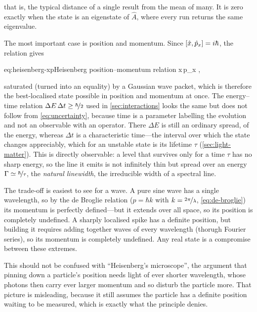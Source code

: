     that is, the typical distance of a single result from the mean of many. It is zero exactly when the state is an eigenstate of $\hat{A}$, where every run returns the same eigenvalue.

    The most important case is position and momentum. Since $\left[\hat{x},\hat{p}_x\right] = i\hbar$, the relation gives

    \begin{keyeq}{eq:heisenberg-xp}{Heisenberg position--momentum relation}
        \Delta x\,\Delta p_x \geq {},
    \end{keyeq}

    saturated (turned into an equality) by a Gaussian wave packet, which is therefore the best-localised state possible in position and momentum at once. The energy--time relation $\Delta E\,\Delta t \geq \nicefrac{\hbar}{2}$ used in \cref{sec:interactions} looks the same but does not follow from \cref{eq:uncertainty}, because time is a parameter labelling the evolution and not an observable with an operator. There $\Delta E$ is still an ordinary spread, of the energy, whereas $\Delta t$ is a characteristic time---the interval over which the state changes appreciably, which for an unstable state is its lifetime $\tau$ (\cref{sec:light-matter}). This is directly observable: a level that survives only for a time $\tau$ has no sharp energy, so the line it emits is not infinitely thin but spread over an energy $\Gamma \simeq \nicefrac{\hbar}{\tau}$, the \emph{natural linewidth}, the irreducible width of a spectral line.

    The trade-off is easiest to see for a wave. A pure sine wave has a single wavelength, so by the de Broglie relation ($p = \hbar k$ with $k = \nicefrac{2\pi}{\lambda}$, \cref{eq:de-broglie}) its momentum is perfectly defined---but it extends over all space, so its position is completely undefined. A sharply localised spike has a definite position, but building it requires adding together waves of every wavelength (thorugh Fourier series), so its momentum is completely undefined. Any real state is a compromise between these extremes.

    This should not be confused with \enquote{Heisenberg's microscope}, the argument that pinning down a particle's position needs light of ever shorter wavelength, whose photons then carry ever larger momentum and so disturb the particle more. That picture is misleading, because it still assumes the particle has a definite position waiting to be measured, which is exactly what the principle denies.

